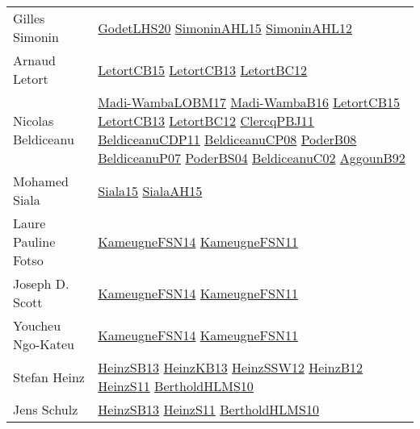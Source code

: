 {\begin{longtable}{p{4cm}p{15cm}}
Gilles Simonin & \href{papers/GodetLHS20.pdf}{GodetLHS20}\cite{GodetLHS20} \href{articles/SimoninAHL15.pdf}{SimoninAHL15}\cite{SimoninAHL15} \href{papers/SimoninAHL12.pdf}{SimoninAHL12}\cite{SimoninAHL12} \\
Arnaud Letort & \href{articles/LetortCB15.pdf}{LetortCB15}\cite{LetortCB15} \href{papers/LetortCB13.pdf}{LetortCB13}\cite{LetortCB13} \href{papers/LetortBC12.pdf}{LetortBC12}\cite{LetortBC12} \\
Nicolas Beldiceanu & \href{papers/Madi-WambaLOBM17.pdf}{Madi-WambaLOBM17}\cite{Madi-WambaLOBM17} \href{papers/Madi-WambaB16.pdf}{Madi-WambaB16}\cite{Madi-WambaB16} \href{articles/LetortCB15.pdf}{LetortCB15}\cite{LetortCB15} \href{papers/LetortCB13.pdf}{LetortCB13}\cite{LetortCB13} \href{papers/LetortBC12.pdf}{LetortBC12}\cite{LetortBC12} \href{papers/ClercqPBJ11.pdf}{ClercqPBJ11}\cite{ClercqPBJ11} \href{articles/BeldiceanuCDP11.pdf}{BeldiceanuCDP11}\cite{BeldiceanuCDP11} \href{papers/BeldiceanuCP08.pdf}{BeldiceanuCP08}\cite{BeldiceanuCP08} \href{papers/PoderB08.pdf}{PoderB08}\cite{PoderB08} \href{papers/BeldiceanuP07.pdf}{BeldiceanuP07}\cite{BeldiceanuP07} \href{articles/PoderBS04.pdf}{PoderBS04}\cite{PoderBS04} \href{papers/BeldiceanuC02.pdf}{BeldiceanuC02}\cite{BeldiceanuC02} \href{papers/AggounB92.pdf}{AggounB92}\cite{AggounB92} \\
Mohamed Siala & \href{articles/Siala15.pdf}{Siala15}\cite{Siala15} \href{papers/SialaAH15.pdf}{SialaAH15}\cite{SialaAH15} \\
Laure Pauline Fotso & \href{articles/KameugneFSN14.pdf}{KameugneFSN14}\cite{KameugneFSN14} \href{papers/KameugneFSN11.pdf}{KameugneFSN11}\cite{KameugneFSN11} \\
Joseph D. Scott & \href{articles/KameugneFSN14.pdf}{KameugneFSN14}\cite{KameugneFSN14} \href{papers/KameugneFSN11.pdf}{KameugneFSN11}\cite{KameugneFSN11} \\
Youcheu Ngo{-}Kateu & \href{articles/KameugneFSN14.pdf}{KameugneFSN14}\cite{KameugneFSN14} \href{papers/KameugneFSN11.pdf}{KameugneFSN11}\cite{KameugneFSN11} \\
Stefan Heinz & \href{articles/HeinzSB13.pdf}{HeinzSB13}\cite{HeinzSB13} \href{papers/HeinzKB13.pdf}{HeinzKB13}\cite{HeinzKB13} \href{articles/HeinzSSW12.pdf}{HeinzSSW12}\cite{HeinzSSW12} \href{papers/HeinzB12.pdf}{HeinzB12}\cite{HeinzB12} \href{papers/HeinzS11.pdf}{HeinzS11}\cite{HeinzS11} \href{papers/BertholdHLMS10.pdf}{BertholdHLMS10}\cite{BertholdHLMS10} \\
Jens Schulz & \href{articles/HeinzSB13.pdf}{HeinzSB13}\cite{HeinzSB13} \href{papers/HeinzS11.pdf}{HeinzS11}\cite{HeinzS11} \href{papers/BertholdHLMS10.pdf}{BertholdHLMS10}\cite{BertholdHLMS10} \\

\end{longtable}}
